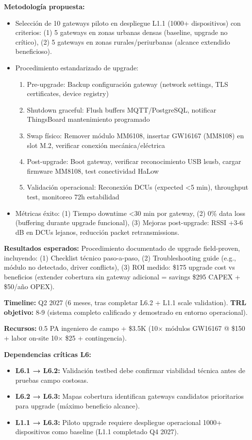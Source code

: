 \textbf{Metodología propuesta:}
\begin{itemize}
    \item Selección de 10 gateways piloto en despliegue L1.1 (1000+ dispositivos) con criterios: (1) 5 gateways en zonas urbanas densas (baseline, upgrade no crítico), (2) 5 gateways en zonas rurales/periurbanas (alcance extendido beneficioso).
    \item Procedimiento estandarizado de upgrade:
    \begin{enumerate}
        \item Pre-upgrade: Backup configuración gateway (network settings, TLS certificates, device registry)
        \item Shutdown graceful: Flush buffers MQTT/PostgreSQL, notificar ThingsBoard mantenimiento programado
        \item Swap físico: Remover módulo MM6108, insertar GW16167 (MM8108) en slot M.2, verificar conexión mecánica/eléctrica
        \item Post-upgrade: Boot gateway, verificar reconocimiento USB lsusb, cargar firmware MM8108, test conectividad HaLow
        \item Validación operacional: Reconexión DCUs (expected <5 min), throughput test, monitoreo 72h estabilidad
    \end{enumerate}
    \item Métricas éxito: (1) Tiempo downtime <30 min por gateway, (2) 0\% data loss (buffering durante upgrade funcional), (3) Mejoras post-upgrade: RSSI +3-6 dB en DCUs lejanos, reducción packet retransmissions.
\end{itemize}

\textbf{Resultados esperados:} Procedimiento documentado de upgrade field-proven, incluyendo: (1) Checklist técnico paso-a-paso, (2) Troubleshooting guide (e.g., módulo no detectado, driver conflicts), (3) ROI medido: \$175 upgrade cost vs beneficios (extender cobertura sin gateway adicional = savings \$295 CAPEX + \$50/año OPEX).

\textbf{Timeline:} Q2 2027 (6 meses, tras completar L6.2 + L1.1 scale validation). \textbf{TRL objetivo:} 8-9 (sistema completo calificado y demostrado en entorno operacional).

\textbf{Recursos:} 0.5 PA ingeniero de campo + \$3.5K (10$\times$ módulos GW16167 @ \$150 + labor on-site 10$\times$ \$25 + contingencia).

\textbf{Dependencias críticas L6:}
\begin{itemize}
    \item \textbf{L6.1 → L6.2:} Validación testbed debe confirmar viabilidad técnica antes de pruebas campo costosas.
    \item \textbf{L6.2 → L6.3:} Mapas cobertura identifican gateways candidatos prioritarios para upgrade (máximo beneficio alcance).
    \item \textbf{L1.1 → L6.3:} Piloto upgrade requiere despliegue operacional 1000+ dispositivos como baseline (L1.1 completado Q4 2027).
\end{itemize}


